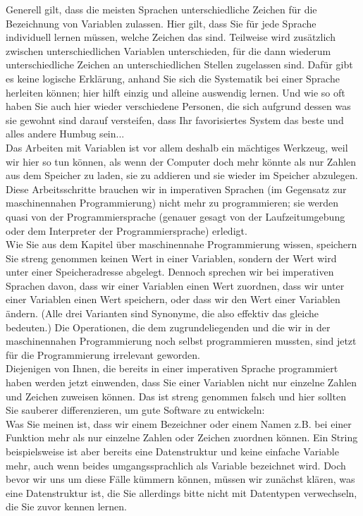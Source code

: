 Generell gilt, dass die meisten Sprachen unterschiedliche Zeichen für die Bezeichnung von Variablen zulassen. Hier gilt, dass Sie für jede Sprache individuell lernen müssen, welche Zeichen das sind. Teilweise wird zusätzlich zwischen unterschiedlichen Variablen unterschieden, für die dann wiederum unterschiedliche Zeichen an unterschiedlichen Stellen zugelassen sind. Dafür gibt es keine logische Erklärung, anhand Sie sich die Systematik bei einer Sprache herleiten können; hier hilft einzig und alleine auswendig lernen. Und wie so oft haben Sie auch hier wieder verschiedene Personen, die sich aufgrund dessen was sie gewohnt sind darauf versteifen, dass Ihr favorisiertes System das beste und alles andere Humbug sein...\\

Das Arbeiten mit Variablen ist vor allem deshalb ein mächtiges Werkzeug, weil wir hier so tun können, als wenn der Computer doch mehr könnte als nur Zahlen aus dem Speicher zu laden, sie zu addieren und sie wieder im Speicher abzulegen. Diese Arbeitsschritte brauchen wir in imperativen Sprachen (im Gegensatz zur maschinennahen Programmierung) nicht mehr zu programmieren; sie werden quasi von der Programmiersprache (genauer gesagt von der Laufzeitumgebung oder dem Interpreter der Programmiersprache) erledigt.\\

Wie Sie aus dem Kapitel über maschinennahe Programmierung wissen, speichern Sie streng genommen keinen Wert in einer Variablen, sondern der Wert wird unter einer Speicheradresse abgelegt. Dennoch sprechen wir bei imperativen Sprachen davon, dass wir einer Variablen einen Wert zuordnen, dass wir unter einer Variablen einen Wert speichern, oder dass wir den Wert einer Variablen ändern. (Alle drei Varianten sind Synonyme, die also effektiv das gleiche bedeuten.) Die Operationen, die dem zugrundeliegenden und die wir in der maschinennahen Programmierung noch selbst programmieren mussten, sind jetzt für die Programmierung irrelevant geworden.\\

Diejenigen von Ihnen, die bereits in einer imperativen Sprache programmiert haben werden jetzt einwenden, dass Sie einer Variablen nicht nur einzelne Zahlen und Zeichen zuweisen können. Das ist streng genommen falsch und hier sollten Sie sauberer differenzieren, um gute Software zu entwickeln:\\

Was Sie meinen ist, dass wir einem Bezeichner oder einem Namen z.B. bei einer Funktion mehr als nur einzelne Zahlen oder Zeichen zuordnen können. Ein String beispielsweise ist aber bereits eine Datenstruktur und keine einfache Variable mehr, auch wenn beides umgangssprachlich als Variable bezeichnet wird. Doch bevor wir uns um diese Fälle kümmern können, müssen wir zunächst klären, was eine Datenstruktur ist, die Sie allerdings bitte nicht mit Datentypen verwechseln, die Sie zuvor kennen lernen.\\

